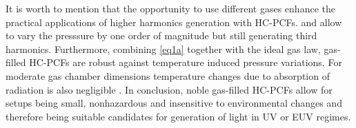 \documentclass[fleqn, 10pt, twocolumn]{SelfArx}
\begin{document}
    It is worth to mention that the opportunity to use different gases enhance the practical applications of higher harmonics generation with HC-PCFs. 
     and  allow to vary the presssure by one order of magnitude but still generating third harmonics. 
    Furthermore, combining \autoref{eq1a} together with the ideal gas law, gas-filled HC-PCFs are robust against temperature induced pressure variations. For moderate gas chamber dimensions temperature changes due to absorption of radiation is also negligible \cite{Serebryannikov2004}.
    In conclusion, noble gas-filled HC-PCFs allow for setups being small, nonhazardous and insensitive to environmental changes and therefore being 
    suitable candidates for generation of light in UV or EUV regimes.
    

    \printbibliography
\end{document}
